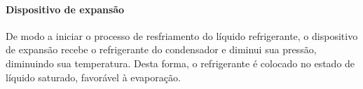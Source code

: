 \documentclass[10pt,a4paper]{article}
\begin{document}
\paragraph*{{ Dispositivo de expansão}}
De modo a iniciar o processo de resfriamento do líquido refrigerante, o dispositivo de expansão recebe o refrigerante do condensador e diminui sua pressão, diminuindo sua temperatura. Desta forma, o refrigerante é colocado no estado de líquido saturado, favorável à evaporação.

\end{document}
